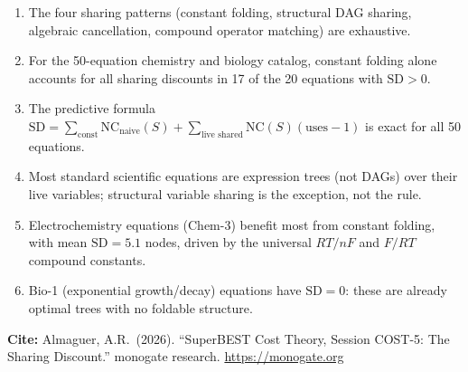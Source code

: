 \documentclass[12pt,a4paper]{article}
\theoremstyle{definition}
\newcommand{\NC}{\mathrm{NC}}
\newcommand{\SD}{\mathrm{SD}}
\begin{document}
\begin{enumerate}
  \item The four sharing patterns (constant folding, structural DAG sharing,
        algebraic cancellation, compound operator matching) are exhaustive.
  \item For the 50-equation chemistry and biology catalog, constant folding
        alone accounts for all sharing discounts in 17 of the 20 equations
        with $\SD > 0$.
  \item The predictive formula $\SD = \sum_{\text{const}} \NC_{\mathrm{naive}}(S)
        + \sum_{\text{live shared}} \NC(S)(\mathrm{uses}-1)$ is exact for
        all 50 equations.
  \item Most standard scientific equations are expression trees (not DAGs)
        over their live variables; structural variable sharing is the
        exception, not the rule.
  \item Electrochemistry equations (Chem-3) benefit most from constant
        folding, with mean $\SD = 5.1$ nodes, driven by the universal
        $RT/nF$ and $F/RT$ compound constants.
  \item Bio-1 (exponential growth/decay) equations have $\SD = 0$:
        these are already optimal trees with no foldable structure.
\end{enumerate}

\bigskip
\noindent\textbf{Cite:} Almaguer, A.R.\ (2026).
``SuperBEST Cost Theory, Session COST-5: The Sharing Discount.''
monogate research.
\url{https://monogate.org}
\end{document}
